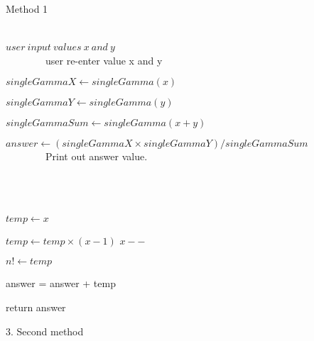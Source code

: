 \documentclass{article} \usepackage{mathtools} \usepackage{algorithm}
\begin{document}
\begin{algorithm} 
\caption{Method 1}
\label{euclid} 
\begin{algorithmic}[1] 

 \\
$user \ input \ values \  x \ and \  y$ \ 
 \\
\ \ \ \ \ \ \ \ user re-enter value x and y \\
\EndWhile

\State $singleGammaX\gets singleGamma(x)$ 

\State $singleGammaY\gets singleGamma(y)$ 

\State $singleGammaSum\gets singleGamma(x + y)$ 

\State $answer \gets( singleGammaX \times singleGammaY ) / singleGammaSum$  \\

\ \ \ \ \ \ \ \ Print out answer value.

\EndProcedure  \\ 
 \\
\\

\State $temp \gets x $

\State $temp\gets temp \times (x-1)$ 
\State $ x--$ 
\EndWhile


\State $n! \gets temp$


\State answer = answer + temp
\EndWhile

\State return answer

\EndProcedure 
\end{algorithmic}


\end{algorithm} 


\newpage
{\large 3. Second method  }\\
 
\end{document}
